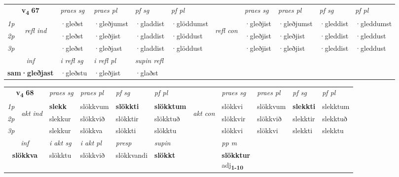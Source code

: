 \noindent
\begin{tabular}{lllllllllll} \toprule
\multicolumn{2}{c}{\textbf{v{\textsubscript{4}}} \Large{\textbf{67}}}  &  \textit{praes sg}  & \textit{praes pl}  &\textit{ pf sg} & \textit{pf pl} &  &  \textit{praes sg}  & \textit{praes pl}  & \textit{pf sg} & \textit{pf pl } \\*
	\cmidrule{3-6} \cmidrule{8-11}
 {\textit{1p}} & \multirow{3}{*}{\begin{turn}{90}\textit{refl ind}\end{turn}}  & ·gleðst & ·gleðjumst & ·gladdist & ·glöddumst & \multirow{3}{*}{\begin{turn}{90}\textit{refl con}\end{turn}}  &·gleðjist & ·gleðjumst & ·gleddist & ·gleddumst \\*
 {\textit{2p}} &  & ·gleðst & ·gleðjist & ·gladdist & ·glöddust & &·gleðjist & ·gleðjist & ·gleddist & ·gleddust \\*
 {\textit{3p}}  & & ·gleðst & ·gleðjast & ·gladdist & ·glöddust & & ·gleðjist & ·gleðjist& ·gleddist & ·gleddust \\*
\cmidrule{3-6} \cmidrule{8-11}

   \multicolumn{2}{c}{\textit{inf}}   & \textit{i refl sg} & \textit{i refl pl}   & \textit{supin refl}  \\*
  \multicolumn{2}{c}{\textbf{sam\allowbreak ·gleðjast}}    & ·gleðstu & ·gleðjist   & ·glaðst  \\*
\end{tabular}

\noindent
\begin{tabular}{lllllllllll} \toprule
\multicolumn{2}{c}{\textbf{v{\textsubscript{4}}} \Large{\textbf{68}}}  &  \textit{praes sg}  & \textit{praes pl}  &\textit{ pf sg} & \textit{pf pl} &  &  \textit{praes sg}  & \textit{praes pl}  & \textit{pf sg} & \textit{pf pl } \\*
	\cmidrule{3-6} \cmidrule{8-11}
 {\textit{1p}} & \multirow{3}{*}{\begin{turn}{90}\textit{akt ind}\end{turn}} & \textbf{slekk} & slökkvum & \textbf{slökkti} & \textbf{slökktum} & \multirow{3}{*}{\begin{turn}{90}\textit{akt con}\end{turn}} &slökkvi & slökkvum & \textbf{slekkti} & slekktum\\*
 {\textit{2p}} &  &  slekkur  & slökkvið & slökktir & slökktuð & & slökkvir & slökkvið & slekktir & slekktuð \\*
{\textit{3p}} &  & slekkur & slökkva & slökkti & slökktu & & slökkvi & slökkvi& slekkti & slekktu \\*
\cmidrule{3-6} \cmidrule{8-11}

   \multicolumn{2}{c}{\textit{inf}}  & \textit{i akt sg} & \textit{i akt pl}   & \textit{presp} & \textit{supin}  && \textit{pp m} \\*
  \multicolumn{2}{c}{\textbf{slökkva}} & slökktu  & slökkvið   & slökkvandi &  \textbf{slökkt}  && \specialcell{\textbf{slökktur} \\ adj\textbf{\textsubscript{1-10}}} \\*
\end{tabular}

